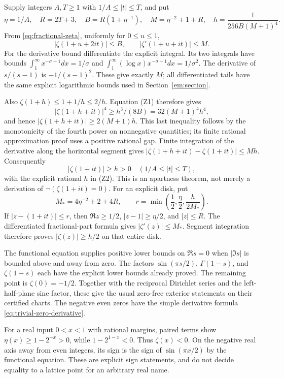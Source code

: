 Supply integers $A,T\ge1$ with $1/A\le|t|\le T$, and put
\[
 \eta=1/A,\quad R=2T+3,\quad
 B=R(1+\eta^{-1}),\quad M=\eta^{-2}+1+R,
 \quad h=\frac1{256B(M+1)^4}.
 \tag{Z2}\label{eq:boundary-constants}
\]
From \eqref{eq:fractional-zeta}, uniformly for $0\le u\le1$,
\[
 |\zeta(1+u+2it)|\le B,\qquad
 |\zeta'(1+u+it)|\le M.
\]
For the derivative bound differentiate the explicit integral. Its two
integrals have bounds
$\int_1^\infty x^{-\sigma-1}dx=1/\sigma$ and
$\int_1^\infty(\log x)x^{-\sigma-1}dx=1/\sigma^2$.
The derivative of $s/(s-1)$ is $-1/(s-1)^2$. These give exactly $M$;
all differentiated tails have the same explicit logarithmic bounds used
in Section~\ref{em:section}.

Also $\zeta(1+h)\le1+1/h\le2/h$. Equation (Z1) therefore gives
\[
 |\zeta(1+h+it)|^4\ge h^3/(8B)
       =32(M+1)^4h^4,
\]
and hence $|\zeta(1+h+it)|\ge2(M+1)h$. This last inequality follows
by the monotonicity of the fourth power on nonnegative quantities; its
finite rational approximation proof uses a positive rational gap.
Finite integration of the derivative along the horizontal segment gives
$|\zeta(1+h+it)-\zeta(1+it)|\le Mh$. Consequently
\begin{equation}
 \boxed{\displaystyle |\zeta(1+it)|\ge h>0
       \quad\left(1/A\le|t|\le T\right),}
 \label{eq:boundary-apartness}
\end{equation}
with the explicit rational $h$ in (Z2). This is an apartness theorem,
not merely a derivation of $\neg(\zeta(1+it)=0)$.
For an explicit disk, put
\[
 M_* =4\eta^{-2}+2+4R,\qquad
 r=\min\left(\frac12,\frac\eta2,\frac{h}{2M_*}\right).
\]
If $|z-(1+it)|\le r$, then $\Re z\ge1/2$, $|z-1|\ge\eta/2$,
and $|z|\le R$. The differentiated fractional-part formula gives
$|\zeta'(z)|\le M_*$. Segment integration therefore proves
$|\zeta(z)|\ge h/2$ on that entire disk.

The functional equation supplies positive lower bounds on $\Re s=0$
when $|\Im s|$ is bounded above and away from zero. The factors
$\sin(\pi s/2)$, $\Gamma(1-s)$, and $\zeta(1-s)$ each have the
explicit lower bounds already proved. The remaining point is
$\zeta(0)=-1/2$. Together with the reciprocal Dirichlet series and the
left-half-plane sine factor, these give the usual zero-free exterior
statements on their certified charts. The negative even zeros have the
simple derivative formula \eqref{eq:trivial-zero-derivative}.

For a real input $0<x<1$ with rational margins, paired terms show
$\eta(x)\ge1-2^{-x}>0$, while $1-2^{1-x}<0$. Thus $\zeta(x)<0$.
On the negative real axis away from even integers, its sign is the sign
of $\sin(\pi x/2)$ by the functional equation. These are explicit sign
statements, and do not decide equality to a lattice point for an
arbitrary real name.

